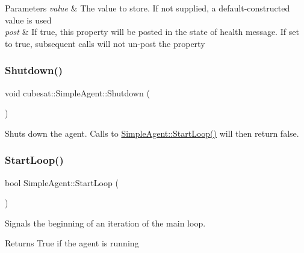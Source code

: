 \begin{DoxyParams}{Parameters}
{\em value} & The value to store. If not supplied, a default-\/constructed value is used \\
\hline
{\em post} & If true, this property will be posted in the state of health message. If set to true, subsequent calls will not \textquotesingle{}un-\/post\textquotesingle{} the property \\
\hline
\end{DoxyParams}
\mbox{\label{classcubesat_1_1SimpleAgent_a1b7189441b53515286ba3e6358f24edf}} 
\subsubsection{\texorpdfstring{Shutdown()}{Shutdown()}}
{\footnotesize\ttfamily void cubesat\+::\+Simple\+Agent\+::\+Shutdown (\begin{DoxyParamCaption}{ }\end{DoxyParamCaption})\hspace{0.3cm}{\ttfamily [inline]}}



Shuts down the agent. Calls to \hyperlink{classcubesat_1_1SimpleAgent_a84d504d569e58628a9ae6007c34b8463}{Simple\+Agent\+::\+Start\+Loop()} will then return false. 

\mbox{\label{classcubesat_1_1SimpleAgent_a84d504d569e58628a9ae6007c34b8463}} 
\subsubsection{\texorpdfstring{Start\+Loop()}{StartLoop()}}
{\footnotesize\ttfamily bool Simple\+Agent\+::\+Start\+Loop (\begin{DoxyParamCaption}{ }\end{DoxyParamCaption})}



Signals the beginning of an iteration of the main loop. 

\begin{DoxyReturn}{Returns}
True if the agent is running 
\end{DoxyReturn}


